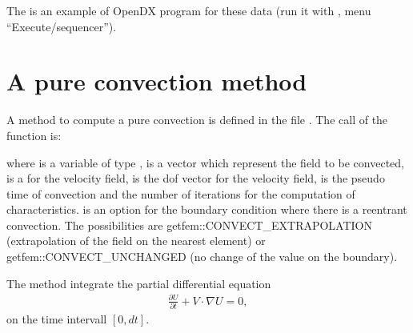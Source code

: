 \documentclass[a4paper,11pt,english]{sphinxmanual}
\begin{document}
The  is an example of OpenDX program for these data
(run it with  , menu
“Execute/sequencer”).


\chapter{A pure convection method}
\label{\detokenize{userdoc/convect:a-pure-convection-method}}\label{\detokenize{userdoc/convect:ud-convect}}\label{\detokenize{userdoc/convect::doc}}
A method to compute a pure convection is defined in the file
. The call of the function is:

\begin{sphinxVerbatim}[commandchars=\\\{\}]
        
\end{sphinxVerbatim}

where  is a variable of type ,  is a vector which represent the
field to be convected,  is a  for the velocity field,  is the
dof vector for the velocity field,  is the pseudo time of convection and
 the number of iterations for the computation of characteristics.  is an option for the boundary condition where there is a re\sphinxhyphen{}entrant convection. The possibilities are getfem::CONVECT\_EXTRAPOLATION (extrapolation of the field on the nearest element) or getfem::CONVECT\_UNCHANGED (no change of the value on the boundary).

The method integrate the partial differential equation
\begin{equation*}
\begin{split}\frac{\partial U}{\partial t} + V\cdot\nabla U = 0,\end{split}
\end{equation*}
on the time intervall \([0, dt]\).
\end{document}
